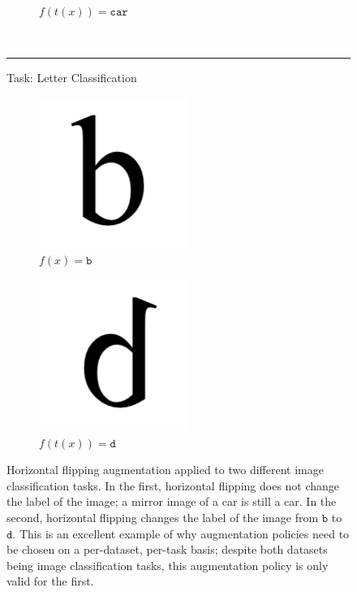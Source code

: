\begin{figure}[ht!]
\begin{subfigure}{.4\textwidth}
		\caption{$f(t(x)) = \texttt{car}$}
	\end{subfigure} \vspace{1em} \\  \hrule \vspace{1em}
	Task: Letter Classification \\ \vspace{1em}
	\begin{subfigure}{.4\textwidth}
		\centering
		\includegraphics[width=.5\textwidth]{data/b}
		\caption{$f(x) = \texttt{b}$}
	\end{subfigure}
	\begin{subfigure}{.4\textwidth}
		\centering
		\includegraphics[width=.5\textwidth]{data/b_flip}
		\caption{$f(t(x)) = \texttt{d}$}
	\end{subfigure}
\caption[Various augmentations and how they potentially permute data labels]{Horizontal flipping augmentation applied to two different image classification tasks. In the first, horizontal
flipping does not change the label of the image; a mirror image of a car is still a car. In the second, horizontal flipping
changes the label of the image from $\texttt{b}$ to $\texttt{d}$. This is an excellent example of why augmentation policies
need to be chosen on a per-dataset, per-task basis; despite both datasets being image classification tasks, this augmentation
policy is only valid for the first.}
\label{fig:image_transformations}
\end{figure}

